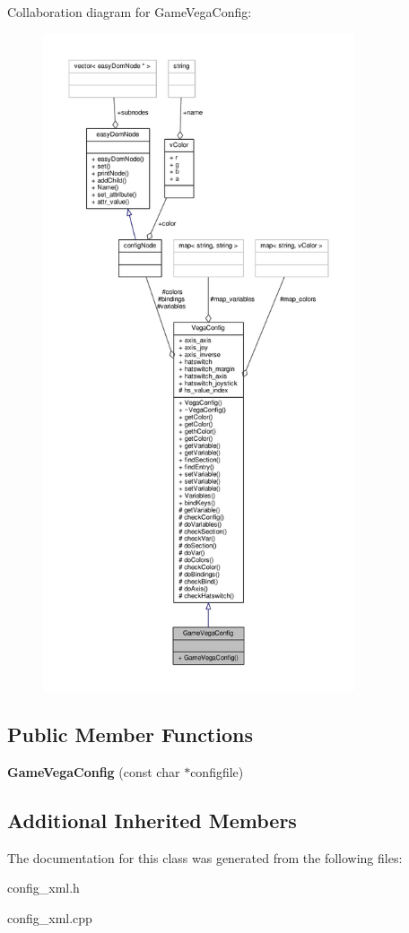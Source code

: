 Collaboration diagram for Game\+Vega\+Config\+:
\nopagebreak
\begin{figure}[H]
\begin{center}
\leavevmode
\includegraphics[height=550pt]{d8/d08/classGameVegaConfig__coll__graph}
\end{center}
\end{figure}
\subsection*{Public Member Functions}
\begin{DoxyCompactItemize}
\item 
{\bfseries Game\+Vega\+Config} (const char $\ast$configfile)\hypertarget{classGameVegaConfig_af7c33fc11622afcfa6feb4ed501eb609}{}\label{classGameVegaConfig_af7c33fc11622afcfa6feb4ed501eb609}

\end{DoxyCompactItemize}
\subsection*{Additional Inherited Members}


The documentation for this class was generated from the following files\+:\begin{DoxyCompactItemize}
\item 
config\+\_\+xml.\+h\item 
config\+\_\+xml.\+cpp\end{DoxyCompactItemize}
